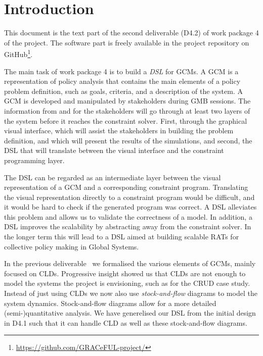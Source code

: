 \section{Introduction}\label{introduction}

This document is the text part of the second deliverable (D4.2) of
work package 4 of the \grace project.
%
The software part is freely available in the project repository on
GitHub\footnote{\url{https://github.com/GRACeFUL-project/}}.

The main task of work package 4 is to build a \emph{\ac{DSL}} for
\acp{GCM}.
%
A \ac{GCM} is a representation of policy analysis that contains the
main elements of a policy problem definition, such as goals, criteria,
and a description of the system.
%
A \ac{GCM} is developed and manipulated by stakeholders during
\ac{GMB} sessions.
%
The information from and for the stakeholders will go through at least
two layers of the \grace system before it reaches the constraint
solver.
%
First, through the graphical visual interface, which will assist the
stakeholders in building the problem definition, and which will
present the results of the simulations, and second, the \ac{DSL} that
will translate between the visual interface and the constraint
programming layer.

The \ac{DSL} can be regarded as an intermediate layer between the
visual representation of a \acf{GCM} and a corresponding constraint
program.
%
Translating the visual representation directly to a constraint program
would be difficult, and it would be hard to check if the generated
program was correct.
%
A DSL alleviates this problem and allows us to validate the
correctness of a model.
%
In addition, a \ac{DSL} improves the scalability by abstracting away
from the constraint solver.
%
In the longer term this will lead to a \ac{DSL} aimed at building
scalable \acp{RAT} for collective policy making in Global Systems.


In the previous deliverable~\cite{D4.1} we formalised the various
elements of \acp{GCM}, mainly focused on \acp{CLD}.
%
Progressive insight showed us that \acp{CLD} are not enough to model
the systems the project is envisioning, such as for the \ac{CRUD} case
study.
%
Instead of just using \aclp{CLD} we now also use \emph{stock-and-flow}
diagrams to model the system dynamics.
%
Stock-and-flow diagrams allow for a more detailed (semi-)quantitative
analysis.
%
We have generelised our DSL from the initial design in D4.1 such that
it can handle \acl{CLD} as well as these stock-and-flow diagrams.


